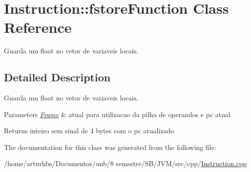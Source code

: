 \hypertarget{classInstruction_1_1fstoreFunction}{}\section{Instruction\+:\+:fstore\+Function Class Reference}
\label{classInstruction_1_1fstoreFunction}


Guarda um float no vetor de variaveis locais.  




\subsection{Detailed Description}
Guarda um float no vetor de variaveis locais. 


\begin{DoxyParams}{Parameters}
{\em \hyperlink{classFrame}{Frame}} & atual para utilizacao da pilha de operandos e pc atual \\
\hline
\end{DoxyParams}
\begin{DoxyReturn}{Returns}
inteiro sem sinal de 4 bytes com o pc atualizado 
\end{DoxyReturn}


The documentation for this class was generated from the following file\+:\begin{DoxyCompactItemize}
\item 
/home/arturhbs/\+Documentos/unb/8 semestre/\+S\+B/\+J\+V\+M/src/cpp/\hyperlink{Instruction_8cpp}{Instruction.\+cpp}\end{DoxyCompactItemize}
